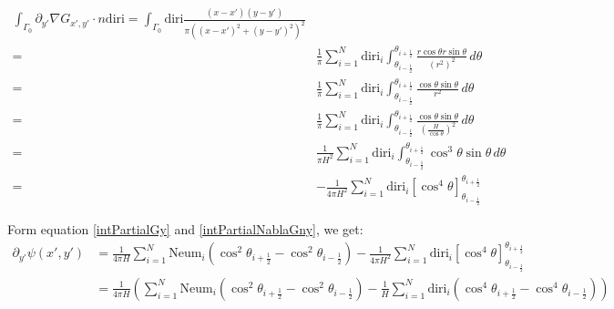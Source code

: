 \documentclass[a4paper,12pt]{article}
\newcommand{\integ}[3]{%
\ensuremath{\displaystyle{\int^{#2}_{#1} #3}}}
\begin{document}
\begin{enumerate}
\begin{align}
 \integ{\Gamma_0}{}{\partial_{y'}\nabla G_{x',y'} \cdot n \text{diri}}=\integ{\Gamma_0}{}{\text{diri}\frac{(x-x')(y-y')}{\pi \left( (x-x')^2+(y-y')^2\right)^2}}\\
=&\frac{1}{\pi}\sum\limits_{i=1}^N \text{diri}_i \integ{\theta_{i-\frac{1}{2}}}{\theta_{i+\frac{1}{2}}}{\frac{r \cos\theta r \sin \theta}{\left(r^2 \right)^2} \, d\theta}\\
=&\frac{1}{\pi}\sum\limits_{i=1}^N \text{diri}_i \integ{\theta_{i-\frac{1}{2}}}{\theta_{i+\frac{1}{2}}}{\frac{\cos\theta \sin \theta}{r^2} \, d\theta}\\
=&\frac{1}{\pi}\sum\limits_{i=1}^N \text{diri}_i \integ{\theta_{i-\frac{1}{2}}}{\theta_{i+\frac{1}{2}}}{\frac{\cos\theta \sin \theta}{\left(\frac{H}{\cos\theta}\right)^2} \, d\theta}\\
=& \frac{1}{\pi H^2}\sum\limits_{i=1}^N \text{diri}_i \integ{\theta_{i-\frac{1}{2}}}{\theta_{i+\frac{1}{2}}}{\cos^3\theta \sin \theta \, d\theta}\\
=&-\frac{1}{4\pi H^2}\sum\limits_{i=1}^N \text{diri}_i \left[\cos^4\theta \right]_{\theta_{i-\frac{1}{2}}}^{\theta_{i+\frac{1}{2}}} \label{intPartialNablaGny}
\end{align}
\end{enumerate}

Form equation \ref{intPartialGy} and \ref{intPartialNablaGny}, we get:
\begin{align}
 \partial_{y'} \psi(x',y')&=\frac{1}{4\pi H}\sum\limits_{i=1}^N \text{Neum}_i \left(\cos^2\theta_{i+\frac{1}{2}}-\cos^2\theta_{i-\frac{1}{2}}\right)
 -\frac{1}{4\pi H^2}\sum\limits_{i=1}^N \text{diri}_i \left[\cos^4\theta \right]_{\theta_{i-\frac{1}{2}}}^{\theta_{i+\frac{1}{2}}}\\
 &=\frac{1}{4\pi H}\left( \sum\limits_{i=1}^N \text{Neum}_i \left(\cos^2\theta_{i+\frac{1}{2}}-\cos^2\theta_{i-\frac{1}{2}}\right)- 
 \frac{1}{H}\sum\limits_{i=1}^N \text{diri}_i \left( \cos^4\theta_{i+\frac{1}{2}}- \cos^4 \theta_{i-\frac{1}{2}} \right) \right)
\end{align}
\end{document}
